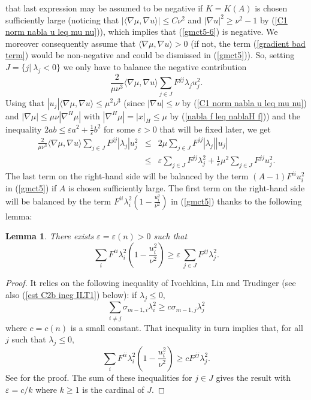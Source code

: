 \documentclass[10pt,reqno,oneside]{amsart}
\newtheorem{lem}{Lemma}[section]
\theoremstyle{definition}
\theoremstyle{remark}
\begin{document}
that last expression may be assumed to be negative if $K=K(A)$ is chosen sufficiently large (noticing that $|\langle\nabla\mu,\nabla u\rangle|\leq C\nu^2$ and $|\nabla u|^2\geq \nu^2-1$ by (\ref{C1 norm nabla u leq mu nu})), which implies that (\ref{gmct5-6}) is negative. We moreover consequently assume that $\langle\nabla\mu,\nabla u\rangle>0$ (if not, the term (\ref{gradient bad term}) would be non-negative and could be dismissed in (\ref{gmct5})). So, setting $J=\{j|\ \lambda_j<0\}$ we only have to balance the negative contribution
$$\frac{2}{\mu\nu^3}\langle\nabla\mu,\nabla u\rangle\sum_{j\in J}F^{jj}\lambda_ju_j^2.$$
Using that $|u_j|\langle\nabla\mu,\nabla u\rangle\leq\mu^2\nu^3$ (since $|\nabla u|\leq \nu$ by (\ref{C1 norm nabla u leq mu nu}) and $|\nabla\mu|\leq \mu\nu|\nabla ^H\mu|$ with $|\nabla^H\mu|=|x|_H\leq\mu$ by (\ref{nabla f leq nablaH f})) and the inequality $2ab\leq \varepsilon a^2+\frac{1}{\varepsilon}b^2$ for some $\varepsilon>0$ that will be fixed later, we get
\begin{eqnarray}
\frac{2}{\mu\nu^3}\langle\nabla\mu,\nabla u\rangle \sum_{j\in J}F^{jj}|\lambda_j|u_j^2&\leq&2\mu\sum_{j\in J}F^{jj}|\lambda_j||u_j|\nonumber\\
&\leq& \varepsilon\sum_{j\in J}F^{jj}\lambda_j^2+\frac{1}{\varepsilon}\mu^2\sum_{j\in J}F^{jj}u_j^2.\label{ineq bad term epsilon C1 max dirichlet}
\end{eqnarray}
The last term on the right-hand side will be balanced by the term $(A-1)F^{ii}u_i^2$ in (\ref{gmct5}) if $A$ is chosen sufficiently large. The first term on the right-hand side will be balanced by the term $F^{ii}\lambda_i^2\left(1-\frac{u_i^2}{\nu^2}\right)$ in (\ref{gmct5}) thanks to the following lemma:
\begin{lem}\label{lem epsilon C1 max dirichlet}
There exists $\varepsilon=\varepsilon(n)>0$ such that
\begin{equation}\label{eqn lem epsilon C1 max dirichlet}
\sum_iF^{ii}\lambda_i^2\left(1-\frac{u_i^2}{\nu^2}\right)\geq\varepsilon\ \sum_{j\in J}F^{jj}\lambda_j^2.
\end{equation}
\end{lem}
\begin{proof}
It relies on the following inequality of Ivochkina, Lin and Trudinger \cite[ineq. (26)]{LT} (see also (\ref{est C2b ineg ILT1}) below): 
if $\lambda_{j}\leq 0,$
$$\sum_{i\neq j}\sigma_{m-1,i}\lambda_i^2\geq c\sigma_{m-1,j}\lambda_j^2$$
where $c=c(n)$ is a small constant. That inequality in turn implies that, for all $j$ such that $\lambda_j\leq 0,$
$$\sum_iF^{ii}\lambda_i^2\left(1-\frac{u_i^2}{\nu^2}\right)\geq c F^{jj}\lambda_j^2.$$
See \cite[Lemma 4.6]{Bay2} for the proof. The sum of these inequalities for $j\in J$ gives the result with $\varepsilon=c/k$ where $k\geq 1$ is the cardinal of $J.$
\end{proof}
\end{document}
